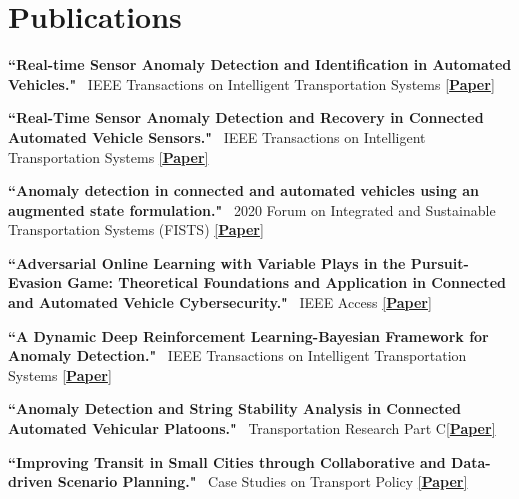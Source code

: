 \documentclass[]{Keval-resume}
\begin{document}
\section{Publications} 
\hrulefill
\postsectionsep 
\begin{cvitems}
\item 
    {\textbf{
    ``Real-time Sensor Anomaly Detection and Identification in Automated Vehicles."}~ IEEE Transactions on Intelligent Transportation Systems
    \hfill\href{https://ieeexplore.ieee.org/abstract/document/8684317}{[\textbf{Paper}]}}
\item
    {\textbf{``Real-Time Sensor Anomaly Detection and Recovery in Connected Automated Vehicle Sensors."}~ IEEE Transactions on Intelligent Transportation Systems
    \hfill\href{https://ieeexplore.ieee.org/abstract/document/8984345}{[\textbf{Paper}]}}
\item 
    {\textbf{``Anomaly detection in connected and automated vehicles using an augmented state formulation."}~ 2020 Forum on Integrated and Sustainable Transportation Systems (FISTS) 
    \hfill\href{https://ieeexplore.ieee.org/abstract/document/9264885}{[\textbf{Paper}]}}
\item
    {\textbf{``Adversarial Online Learning with Variable Plays in the Pursuit-Evasion Game: Theoretical Foundations and Application in Connected and Automated Vehicle Cybersecurity."}~ IEEE Access
    \hfill\href{https://arxiv.org/pdf/2110.14078.pdf}{[\textbf{Paper}]}}
\item
    {\textbf{``A Dynamic Deep Reinforcement Learning-Bayesian Framework for Anomaly Detection."}~ IEEE Transactions on Intelligent Transportation Systems \hfill\href{https://www.researchgate.net/profile/Jeremy-Watts/publication/349376559_A_Dynamic_Deep_Reinforcement_Learning-Bayesian_Framework_for_Anomaly_Detection/links/602d3825299bf1cc26d21a91/A-Dynamic-Deep-Reinforcement-Learning-Bayesian-Framework-for-Anomaly-Detection.pdf}{[\textbf{Paper}]}}
\item 
    {\textbf{``Anomaly Detection and String Stability Analysis in Connected Automated Vehicular Platoons."}~ Transportation Research Part C\hfill\href{https://www.researchgate.net/publication/362382000_Anomaly_Detection_and_String_Stability_Analysis_in_Connected_Automated_Vehicular_Platoons}{[\textbf{Paper}]}}
\item
    {\textbf{``Improving Transit in Small Cities through Collaborative and Data-driven Scenario Planning."}~ Case Studies on Transport Policy \hfill\href{https://www.sciencedirect.com/science/article/pii/S2213624X23000111}{[\textbf{Paper}]}}

\end{cvitems}
\end{document}
